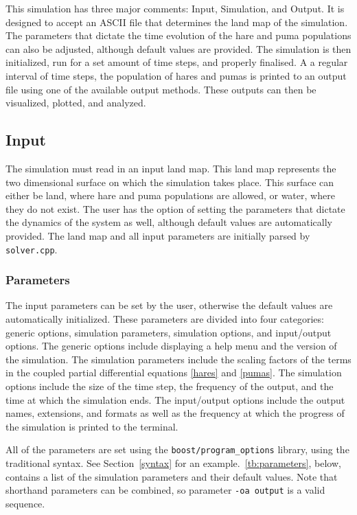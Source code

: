\documentclass[a4paper,11pt]{article}
\begin{document}
{This simulation has three major comments: Input, Simulation, and Output.  
It is designed to accept an ASCII file that determines the land map of the simulation.
The parameters that dictate the time evolution of the hare and puma populations can also be adjusted, although default values are provided.  
The simulation is then initialized, run for a set amount of time steps, and properly finalised.  
A a regular interval of time steps, the population of hares and pumas is printed to an output file using one of the available output methods.  
These outputs can then be visualized, plotted, and analyzed.

\subsection{Input}

The simulation must read in an input land map.  
This land map represents the two dimensional surface on which the simulation takes place.  
This surface can either be land, where hare and puma populations are allowed, or water, where they do not exist.  
The user has the option of setting the parameters that dictate the dynamics of the system as well, although default values are automatically provided.  
The land map and all input parameters are initially parsed by \texttt{solver.cpp}.

\subsubsection{Parameters}\label{params}

The input parameters can be set by the user, otherwise the default values are automatically initialized.  
These parameters are divided into four categories: generic options, simulation parameters, simulation options, and input/output options.
The generic options include displaying a help menu and the version of the simulation.  
The simulation parameters include the scaling factors of the terms in the coupled partial differential equations \eqref{hares} and \eqref{pumas}.  
The simulation options include the size of the time step, the frequency of the output, and the time at which the simulation ends.  
The input/output options include the output names, extensions, and formats as well as the frequency at which the progress of the simulation is printed to the terminal.  

All of the parameters are set using the \texttt{boost/program\_options} library, using the traditional syntax. 
See Section~\ref{syntax} for an example.~\ref{tb:parameters}, below, contains a list of the simulation parameters and their default values. 
Note that shorthand parameters can be combined, so parameter \texttt{-oa output} is a valid sequence.

}
\end{document}
